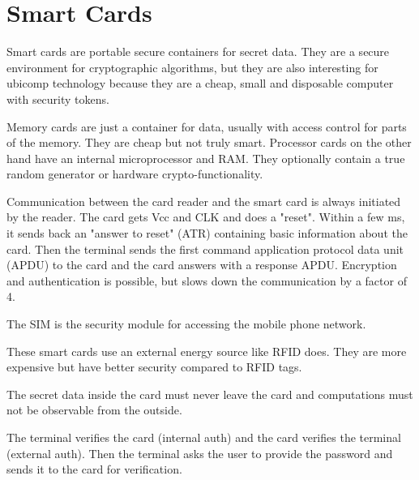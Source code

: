 \section{Smart Cards}
\begin{mytitle} Smart cards are portable secure containers for secret data. They are a secure environment for cryptographic algorithms, but they are also interesting for ubicomp technology because they are a cheap, small and disposable computer with security tokens. 
\end{mytitle}
\begin{mytitle} Memory cards are just a container for data, usually with access control for parts of the memory. They are cheap but not truly smart. Processor cards on the other hand have an internal microprocessor and RAM. They optionally contain a true random generator or hardware crypto-functionality.
\end{mytitle}
\begin{mytitle} Communication between the card reader and the smart card is always initiated by the reader. The card gets Vcc and CLK and does a "reset". Within a few ms, it sends back an "answer to reset" (ATR) containing basic information about the card. Then the terminal sends the first command application protocol data unit (APDU) to the card and the card answers with a response APDU. Encryption and authentication is possible, but slows down the communication by a factor of 4.
\end{mytitle}
\begin{mytitle} The SIM is the security module for accessing the mobile phone network.
\end{mytitle}
\begin{mytitle} These smart cards use an external energy source like RFID does. They are more expensive but have better security compared to RFID tags.
\end{mytitle}
\begin{myremark} The secret data inside the card must never leave the card and computations must not be observable from the outside.
\end{myremark}
\begin{mytitle} The terminal verifies the card (internal auth) and the card verifies the terminal (external auth). Then the terminal asks the user to provide the password and sends it to the card for verification.
\end{mytitle}


